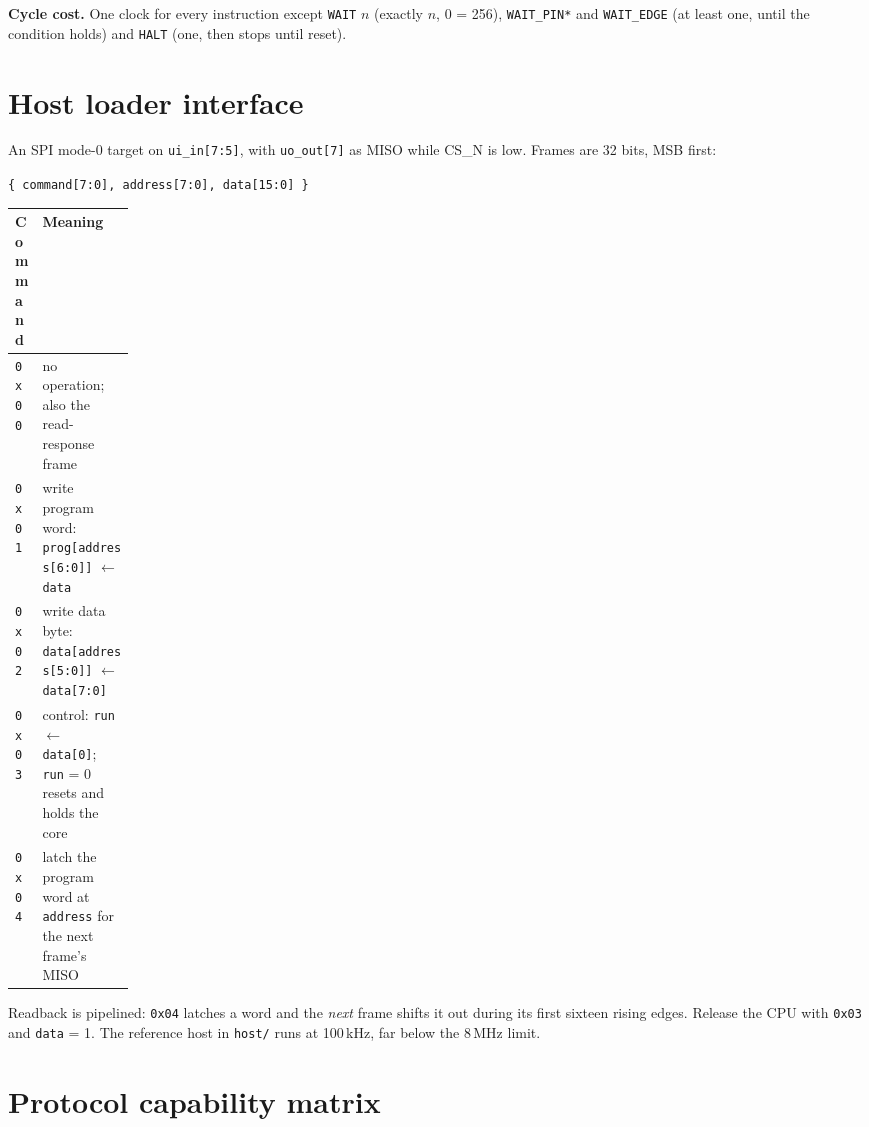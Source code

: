 \documentclass[10pt,a4paper]{article}
\begin{document}
\textbf{Cycle cost.} One clock for every instruction except \texttt{WAIT} $n$
(exactly $n$, $0$ = 256), \texttt{WAIT\_PIN*} and \texttt{WAIT\_EDGE} (at least
one, until the condition holds) and \texttt{HALT} (one, then stops until reset).

\section{Host loader interface}

An SPI mode-0 target on \texttt{ui\_in[7:5]}, with \texttt{uo\_out[7]} as MISO
while CS\_N is low. Frames are 32 bits, MSB first:

\begin{center}
\texttt{\{\,command[7:0], address[7:0], data[15:0]\,\}}
\end{center}

\begin{center}
\begin{tabularx}{0.9\linewidth}{@{}C{0.14\linewidth}X@{}}
\toprule
\textbf{Command} & \textbf{Meaning}\\
\midrule
\texttt{0x00} & no operation; also the read-response frame\\
\texttt{0x01} & write program word: \texttt{prog[address[6:0]]} \(\leftarrow\) \texttt{data}\\
\texttt{0x02} & write data byte: \texttt{data[address[5:0]]} \(\leftarrow\) \texttt{data[7:0]}\\
\texttt{0x03} & control: \texttt{run} \(\leftarrow\) \texttt{data[0]}; \texttt{run} = 0 resets and holds the core\\
\texttt{0x04} & latch the program word at \texttt{address} for the next frame's MISO\\
\bottomrule
\end{tabularx}
\end{center}

Readback is pipelined: \texttt{0x04} latches a word and the \emph{next} frame
shifts it out during its first sixteen rising edges. Release the CPU with
\texttt{0x03} and \texttt{data} = 1. The reference host in \texttt{host/} runs at
100\,kHz, far below the 8\,MHz limit.

\section{Protocol capability matrix}
\end{document}
